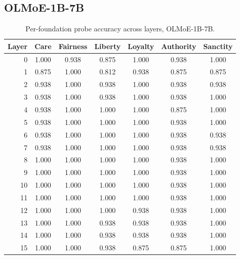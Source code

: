 \subsection{OLMoE-1B-7B}\label{a.2-olmoe-1b-7b}

\begin{table}[h]
\centering
\caption{Per-foundation probe accuracy across layers, OLMoE-1B-7B.}
\label{tab:accuracy_olmoe}
\small
\begin{tabular}{r cccccc}
\toprule
Layer & Care & Fairness & Liberty & Loyalty & Authority & Sanctity \\
\midrule
0  & 1.000 & 0.938 & 0.875 & 1.000 & 0.938 & 1.000 \\
1  & 0.875 & 1.000 & 0.812 & 0.938 & 0.875 & 0.875 \\
2  & 0.938 & 1.000 & 0.938 & 1.000 & 0.938 & 0.938 \\
3  & 0.938 & 1.000 & 0.938 & 1.000 & 0.938 & 1.000 \\
4  & 0.938 & 1.000 & 1.000 & 1.000 & 0.875 & 1.000 \\
5  & 0.938 & 1.000 & 1.000 & 1.000 & 0.938 & 1.000 \\
6  & 0.938 & 1.000 & 1.000 & 1.000 & 0.938 & 0.938 \\
7  & 0.938 & 1.000 & 1.000 & 1.000 & 0.938 & 0.938 \\
8  & 1.000 & 1.000 & 1.000 & 1.000 & 0.938 & 1.000 \\
9  & 1.000 & 1.000 & 1.000 & 1.000 & 0.938 & 1.000 \\
10 & 1.000 & 1.000 & 1.000 & 1.000 & 0.938 & 1.000 \\
11 & 1.000 & 1.000 & 1.000 & 1.000 & 0.938 & 1.000 \\
12 & 1.000 & 1.000 & 1.000 & 0.938 & 0.938 & 1.000 \\
13 & 1.000 & 1.000 & 0.938 & 0.938 & 0.938 & 1.000 \\
14 & 1.000 & 1.000 & 0.938 & 0.938 & 0.938 & 1.000 \\
15 & 1.000 & 1.000 & 0.938 & 0.875 & 0.875 & 1.000 \\
\bottomrule
\end{tabular}
\end{table}
